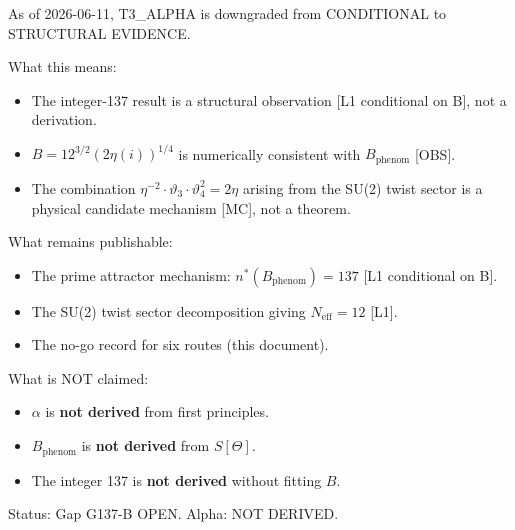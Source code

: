 \documentclass[12pt,a4paper]{article}
\begin{document}
\begin{resultbox}[title={T3\_ALPHA Downgrade --- STRUCTURAL EVIDENCE}]
As of 2026-06-11, T3\_ALPHA is downgraded from CONDITIONAL to STRUCTURAL EVIDENCE.

What this means:
\begin{itemize}
\item The integer-137 result is a structural observation [L1 conditional on B],
  not a derivation.
\item $B = 12^{3/2}(2\eta(i))^{1/4}$ is numerically consistent with
  $B_{\mathrm{phenom}}$ [OBS].
\item The combination $\eta^{-2}\cdot\vartheta_3\cdot\vartheta_4^2 = 2\eta$ arising
  from the SU(2) twist sector is a physical candidate mechanism [MC], not a theorem.
\end{itemize}

What remains publishable:
\begin{itemize}
\item The prime attractor mechanism: $n^*(B_{\mathrm{phenom}}) = 137$ [L1 conditional on B].
\item The SU(2) twist sector decomposition giving $N_{\mathrm{eff}} = 12$ [L1].
\item The no-go record for six routes (this document).
\end{itemize}

What is NOT claimed:
\begin{itemize}
\item $\alpha$ is \textbf{not derived} from first principles.
\item $B_{\mathrm{phenom}}$ is \textbf{not derived} from $S[\Theta]$.
\item The integer 137 is \textbf{not derived} without fitting $B$.
\end{itemize}

Status: Gap G137-B OPEN. Alpha: NOT DERIVED.
\end{resultbox}
\end{document}
